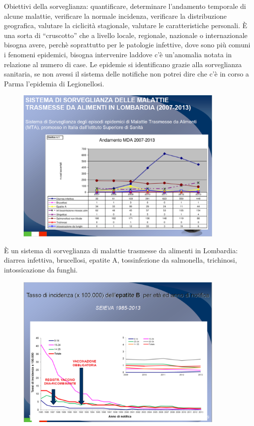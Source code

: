 Obiettivi della sorveglianza: quantificare, determinare l'andamento
temporale di alcune malattie, verificare la normale incidenza,
verificare la distribuzione geografica, valutare la ciclicità
stagionale, valutare le caratteristiche personali. È una sorta di
``cruscotto'' che a livello locale, regionale, nazionale o
internazionale bisogna avere, perchè soprattutto per le patologie
infettive, dove sono più comuni i fenomeni epidemici, bisogna
intervenire laddove c'è un'anomalia notata in relazione al numero di
case. Le epidemie si identificano grazie alla sorveglianza sanitaria, se
non avessi il sistema delle notifiche non potrei dire che c'è in corso a
Parma l'epidemia di Legionellosi.
\begin{figure}[!ht]
\centering
	\includegraphics[width=0.9\textwidth]{02/image10.png}
\end{figure}


È un sistema di sorveglianza di malattie trasmesse da alimenti in
Lombardia: diarrea infettiva, brucellosi, epatite A, tossinfezione da
salmonella, trichinosi, intossicazione da funghi.

\begin{figure}[!ht]
\centering
	\includegraphics[width=0.9\textwidth]{02/image11.png}
\end{figure}


